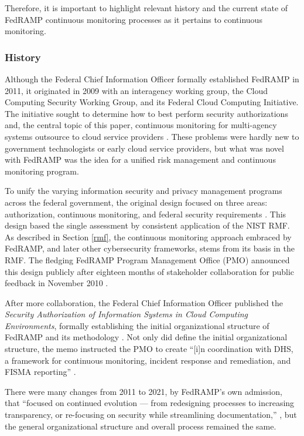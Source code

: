 \documentclass{jdf}
\begin{document}
Therefore, it is important to highlight relevant history and the current state of FedRAMP continuous monitoring processes as it pertains to continuous monitoring.

\subsubsection{History} \label{fedramp_history}

Although the Federal Chief Information Officer formally established FedRAMP in 2011, it originated in 2009 with an interagency working group, the Cloud Computing Security Working Group, and its Federal Cloud Computing Initiative. The initiative sought to determine how to best perform security authorizations and, the central topic of this paper, continuous monitoring for multi-agency systems outsource to cloud service providers \cite[p.~239]{metheny17}. These problems were hardly new to government technologists or early cloud service providers, but what was novel with FedRAMP was the idea for a unified risk management and continuous monitoring program.

To unify the varying information security and privacy management programs across the federal government, the original design focused on three areas: authorization, continuous monitoring, and federal security requirements \cite[p.~240]{metheny17}. This design based the single assessment by consistent application of the NIST RMF. As described in Section \ref{rmf}, the continuous monitoring approach embraced by FedRAMP, and later other cybersecurity frameworks, stems from its basis in the RMF. The fledging FedRAMP Program Management Office (PMO) announced this design publicly after eighteen months of stakeholder collaboration for public feedback in November 2010 \cite[p.~240]{metheny17}.

After more collaboration, the Federal Chief Information Officer published the \textit{Security Authorization of Information Systems in Cloud Computing Environments}, formally establishing the initial organizational structure of FedRAMP and its methodology \cite[p.~241]{metheny17}. Not only did define the initial organizational structure, the memo instructed the PMO to create ``[i]n coordination with DHS, a framework for continuous monitoring, incident response and remediation, and FISMA reporting'' \citeyear[p.~3]{secauthmemo11}.

There were many changes from 2011 to 2021, by FedRAMP's own admission, that ``focused on continued evolution — from redesigning processes to increasing transparency, or re-focusing on security while streamlining documentation,'' \citeyear{fedramp_blog_retrospective21}, but the general organizational structure and overall process remained the same.
\end{document}
